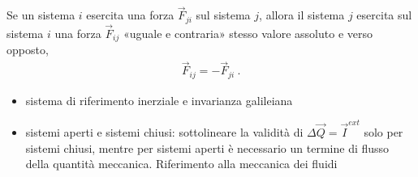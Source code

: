 \documentclass[letterpaper,10pt,italian]{jupyterBook}
\begin{document}
\sphinxAtStartPar
{} Se un sistema \(i\) esercita una forza \(\vec{F}_{ji}\) sul sistema \(j\), allora il sistema \(j\) esercita sul sistema \(i\) una forza \(\vec{F}_{ij}\) «uguale e contraria» \sphinxhyphen{} stesso valore assoluto e verso opposto,
\begin{equation*}
\begin{split}\vec{F}_{ij} = - \vec{F}_{ji} \ .\end{split}
\end{equation*}
\sphinxAtStartPar
{} 
\begin{itemize}
\item {} 
\sphinxAtStartPar
sistema di riferimento inerziale e invarianza galileiana

\item {} 
\sphinxAtStartPar
sistemi aperti e sistemi chiusi: sottolineare la validità di \(\Delta \vec{Q} = \vec{I}^{ext}\) solo per sistemi chiusi, mentre per sistemi aperti è necessario un termine di flusso della quantità meccanica. Riferimento alla meccanica dei fluidi

\end{itemize}
\end{document}
